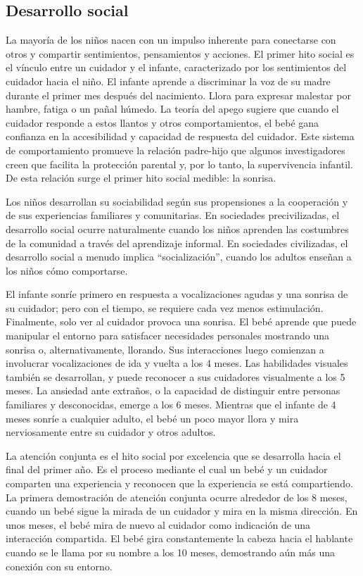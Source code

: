 \documentclass[11pt,letterpaper]{report}
\begin{document}
\subsection{Desarrollo social}
La mayoría de los niños nacen con un impulso inherente para conectarse con
otros y compartir sentimientos, pensamientos y acciones. El primer hito social
es el vínculo entre un cuidador y el infante, caracterizado por los
sentimientos del cuidador hacia el niño. El infante aprende a discriminar la
voz de su madre durante el primer mes después del nacimiento. Llora para
expresar malestar por hambre, fatiga o un pañal húmedo. La teoría del apego
sugiere que cuando el cuidador responde a estos llantos y otros
comportamientos, el bebé gana confianza en la accesibilidad y capacidad de
respuesta del cuidador. Este sistema de comportamiento promueve la relación
padre-hijo que algunos investigadores creen que facilita la protección parental
y, por lo tanto, la supervivencia infantil. De esta relación surge el primer
hito social medible: la sonrisa. \cite{Gerber2011}

Los niños desarrollan su sociabilidad según sus propensiones a la cooperación y
de sus experiencias familiares y comunitarias. En sociedades precivilizadas, el
desarrollo social ocurre naturalmente cuando los niños aprenden las costumbres
de la comunidad a través del aprendizaje informal. En sociedades civilizadas,
el desarrollo social a menudo implica ``socialización'', cuando los adultos
enseñan a los niños cómo comportarse. \cite{Narvaez2021}

El infante sonríe primero en respuesta a vocalizaciones agudas y una sonrisa de
su cuidador; pero con el tiempo, se requiere cada vez menos estimulación.
Finalmente, solo ver al cuidador provoca una sonrisa. El bebé aprende que puede
manipular el entorno para satisfacer necesidades personales mostrando una
sonrisa o, alternativamente, llorando. Sus interacciones luego comienzan a
involucrar vocalizaciones de ida y vuelta a los 4 meses. Las habilidades
visuales también se desarrollan, y puede reconocer a sus cuidadores visualmente
a los 5 meses. La ansiedad ante extraños, o la capacidad de distinguir entre
personas familiares y desconocidas, emerge a los 6 meses. Mientras que el
infante de 4 meses sonríe a cualquier adulto, el bebé un poco mayor llora y
mira nerviosamente entre su cuidador y otros adultos.
\cite{Gerber2011}

La atención conjunta es el hito social por excelencia que se desarrolla hacia
el final del primer año. Es el proceso mediante el cual un bebé y un cuidador
comparten una experiencia y reconocen que la experiencia se está compartiendo.
La primera demostración de atención conjunta ocurre alrededor de los 8 meses,
cuando un bebé sigue la mirada de un cuidador y mira en la misma dirección. En
unos meses, el bebé mira de nuevo al cuidador como indicación de una
interacción compartida. El bebé gira constantemente la cabeza hacia el hablante
cuando se le llama por su nombre a los 10 meses, demostrando aún más una
conexión con su entorno. \cite{Gerber2011}
\end{document}
